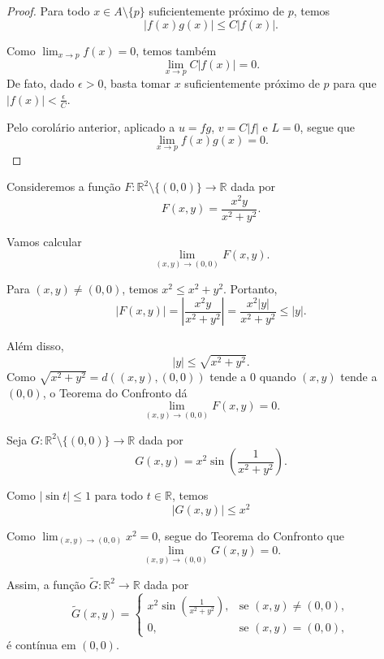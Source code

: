 \begin{proof}
    Para todo $x\in A\setminus\{p\}$ suficientemente próximo de $p$, temos
    \[
        |f(x)g(x)|\leq C|f(x)|.
    \]

    Como $\lim_{x\to p}f(x)=0$, temos também
    \[
        \lim_{x\to p}C|f(x)|=0.
    \]
    De fato, dado $\epsilon>0$, basta tomar $x$ suficientemente próximo de $p$ para que $|f(x)|<\frac{\epsilon}{C}$.

    Pelo corolário anterior, aplicado a $u=fg$, $v=C|f|$ e $L=0$, segue que
    \[
        \lim_{x\to p}f(x)g(x)=0.
    \]
\end{proof}

\begin{example}
    Consideremos a função $F:\mathbb R^2\setminus\{(0,0)\}\to\mathbb R$ dada por
    \[
        F(x,y)=\frac{x^2y}{x^2+y^2}.
    \]

    Vamos calcular
    \[
        \lim_{(x,y)\to(0,0)}F(x,y).
    \]

    Para $(x,y)\neq(0,0)$, temos $x^2\leq x^2+y^2$.
    Portanto,
    \[
        |F(x,y)|
        =
        \left|\frac{x^2y}{x^2+y^2}\right|
        =
        \frac{x^2|y|}{x^2+y^2}
        \leq
        |y|.
    \]

    Além disso,
    \[
        |y|\leq \sqrt{x^2+y^2}.
    \]
    Como $\sqrt{x^2+y^2}=d((x,y),(0,0))$ tende a $0$ quando $(x,y)$ tende a $(0,0)$, o Teorema do Confronto dá
    \[
        \lim_{(x,y)\to(0,0)}F(x,y)=0.
    \]
\end{example}

\begin{example}
    Seja $G:\mathbb R^2\setminus\{(0,0)\}\to\mathbb R$ dada por
    \[
        G(x,y)=x^2\sin\left(\frac{1}{x^2+y^2}\right).
    \]

    Como $|\sin t|\leq 1$ para todo $t\in\mathbb R$, temos
    \[
        |G(x,y)|
        \leq
        x^2
    \]

    Como $\lim_{(x,y)\to(0,0)}x^2=0$, segue do Teorema do Confronto que
    \[
        \lim_{(x,y)\to(0,0)}G(x,y)=0.
    \]

    Assim, a função $\widetilde G:\mathbb R^2\to\mathbb R$ dada por
    \[
        \widetilde G(x,y)=
        \begin{cases}
            x^2\sin\left(\frac{1}{x^2+y^2}\right), & \text{se }(x,y)\neq(0,0),\\
            0, & \text{se }(x,y)=(0,0),
        \end{cases}
    \]
    é contínua em $(0,0)$.
\end{example}

